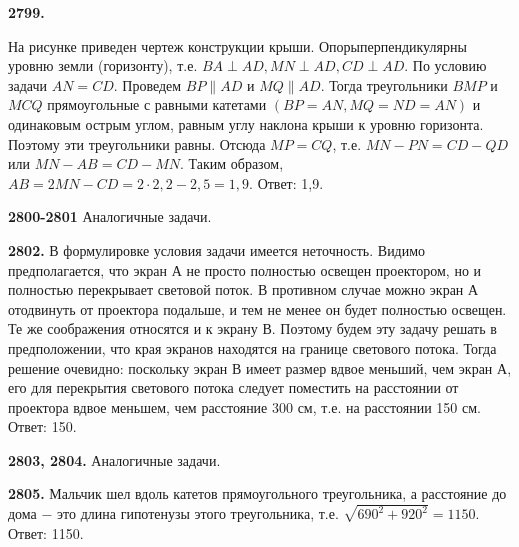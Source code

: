 \textbf{2799.}
\begin{figure}[h]
\end{figure}
На рисунке приведен чертеж конструкции крыши. Опоры\newline перпендикулярны уровню земли (горизонту), т.е. $BA\perp AD,$\newline$MN\perp AD, CD\perp AD$. По условию задачи $AN=CD$. Проведем $BP\|AD$ и $MQ\|AD$. Тогда треугольники $BMP$ и $MCQ$ прямоугольные с равными катетами $(BP=AN, MQ=ND=AN)$ и одинаковым острым углом, равным углу наклона крыши к уровню горизонта. Поэтому эти треугольники равны.
Отсюда $MP=CQ$, т.е. $MN-PN=CD-QD$ или $MN-AB=CD-MN$. Таким образом, $AB=2MN-CD=2\cdot2,2-2,5=1,9.$\newline \null \hspace*{\fill} Ответ: 1,9. 

\textbf{2800-2801} Аналогичные задачи.

\textbf{2802.} В формулировке условия задачи имеется неточность. Видимо предполагается, что экран А не просто полностью освещен проектором, но и полностью перекрывает световой поток. В противном случае можно экран А отодвинуть от проектора подальше, и тем не менее он будет полностью освещен. Те же соображения относятся и к экрану В. Поэтому будем эту задачу решать  в предположении, что края экранов находятся на границе светового потока. Тогда решение очевидно: поскольку экран В имеет размер вдвое меньший, чем экран А, его для перекрытия светового потока следует поместить на расстоянии от проектора вдвое меньшем, чем расстояние 300 см, т.е.  на расстоянии 150 см.        \null \hspace*{\fill} Ответ: 150. 

\textbf{2803, 2804.} Аналогичные задачи.

\textbf{2805.} Мальчик шел вдоль катетов прямоугольного треугольника, а расстояние до дома $-$ это длина гипотенузы этого треугольника, т.е. $\sqrt{690^2 + 920^2} = 1150.$ \newline \null \hspace*{\fill} Ответ: 1150. 

